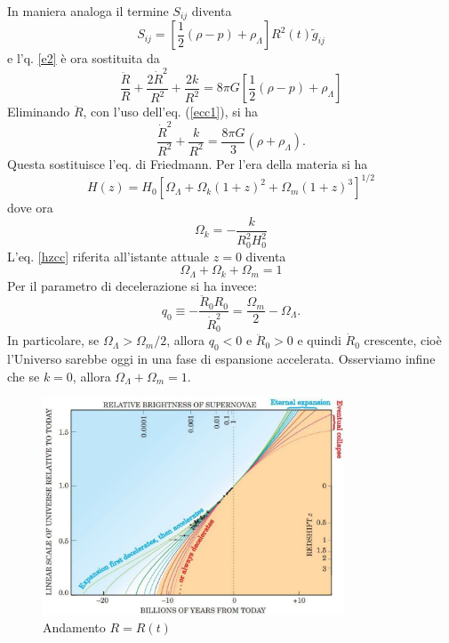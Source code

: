 In maniera analoga il termine $S_{ij}$ diventa
\begin{equation}
  S_{ij}= \left[ \frac {1}{2}(\rho-p)  + \rho_{\Lambda} \right] R^2(t)
  \tilde{g}_{ij}
  \label{sijcc}
\end{equation}
e l'q. \eqref{e2}  è ora sostituita da
\begin{equation}
  \frac {\ddot{R}}{R}+\frac{2\dot{R}^2}{R^2}+\frac{2k}{R^2}=
  8 \pi G \left[ \frac{1}{2}(\rho-p) +\rho_{\Lambda} \right]
\end{equation}
Eliminando $\ddot R$, con l'uso dell'eq. (\ref{ecc1}), si ha
\begin{equation}
  \frac{\dot{R}^2}{R^2} +\frac{k}{R^2} = \frac{8 \pi G}{3} (\rho+\rho_{\Lambda}).
\end{equation}
Questa sostituisce l'eq. di Friedmann. Per l'era della materia si ha
\begin{equation}
  H(z)=H_0\left[\Omega_{\Lambda}+\Omega_{k}(1+z)^2+\Omega_m (1+z)^3\right]^{1/2}
  \label{hzcc}
\end{equation}
dove ora
\begin{equation}
  \Omega_k = - \frac {k}{R_0^2 H_0^2}
\end{equation}
L'eq. \ref{hzcc} riferita all'istante attuale $z=0$ diventa
\begin{equation}
  \Omega_{\Lambda}+\Omega_{k}+\Omega_m = 1
\end{equation}
Per il parametro di decelerazione si ha invece:
\begin{equation}
  q_0 \equiv  -\frac {\ddot R_0 R_0}{\dot R^2_0} = \frac{\Omega_m}{2}
  -\Omega_{\Lambda}.
  \label{q0cc}
\end{equation}
In particolare, se $\Omega_{\Lambda} > \Omega_m/2$, allora $q_0<0$ e
$\ddot{R}_0>0$ e quindi $\dot{R}_0$ crescente, cioè l'Universo sarebbe oggi in
una fase di espansione accelerata.  Osserviamo infine che se $k=0$, allora
$\Omega_{\Lambda} + \Omega_m = 1$.
\begin{figure}
  \centering{}
  \includegraphics[width=0.8\textwidth]{figure/Scale_Factor_vs-Time.pdf}
  \caption{Andamento $R=R(t)$}
  \label{fig:Rvst}
\end{figure}


